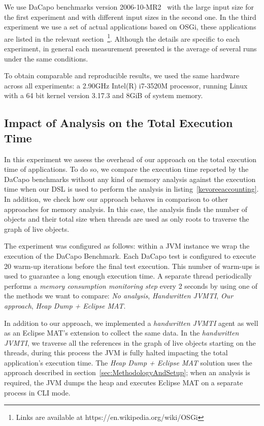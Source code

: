 We use DaCapo benchmarks version 2006-10-MR2~\cite{Blackburn:2006:DBJ:1167473.1167488} with the large input size for the first experiment and with different input sizes in the second one.
In the third experiment we use a set of actual applications based on OSGi, these applications are listed in the relevant section~\footnote{Links are available at https://en.wikipedia.org/wiki/OSGi}.
Although the details are specific to each experiment, in general each measurement presented is the average of several runs under the same conditions.

To obtain comparable and reproducible results, we used the same hardware across all experiments: a 2.90GHz Intel(R) i7-3520M processor, running Linux with a 64 bit kernel version 3.17.3 and 8GiB of system memory.

\subsection{Impact of Analysis on the Total Execution Time}

In this experiment we assess the overhead of our approach on the total execution time of applications.
To do so, we compare the execution time reported by the DaCapo benchmarks without any kind of memory analysis against the execution time when our DSL is used to perform the analysis in listing~\ref{kevoreeaccounting}.
In addition, we check how our approach behaves in comparison to other approaches for memory analysis.
In this case, the analysis finds the number of objects and their total size when threads are used as only roots to traverse the graph of live objects.

The experiment was configured as follows: within a JVM instance we wrap the execution of the DaCapo Benchmark.
Each DaCapo test is configured to execute 20 warm-up iterations before the final test execution.
This number of warm-ups is used to guarantee a long enough execution time.
A separate thread periodically performs a \textit{memory consumption monitoring step} every 2 seconds by using one of the methods we want to compare: \textit{No analysis}, \textit{Handwritten JVMTI}, \textit{Our approach}, \textit{Heap Dump + Eclipse MAT}.

In addition to our approach, we implemented a \textit{handwritten JVMTI} agent as well as an Eclipse MAT's  extension to collect the same data.
In the \textit{handwritten JVMTI}, we traverse all the references in the graph of live objects starting on the threads, during this process the JVM is fully halted impacting the total application's execution time.
The \textit{Heap Dump + Eclipse MAT} solution uses the approach described in section~\ref{sec:MethodologyAndSetup}; when an analysis is required, the JVM dumps the heap and executes Eclipse MAT on a separate process in CLI mode.

